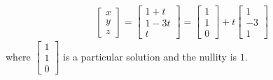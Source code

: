 \begin{solution}
\begin{align*}
\begin{bmatrix}
x \\
y \\
z
\end{bmatrix}
=
\begin{bmatrix}
1+t \\
1-3t \\
t
\end{bmatrix}
=
\begin{bmatrix}
1 \\
1 \\
0
\end{bmatrix}
+ t
\begin{bmatrix}
1 \\
-3 \\
1
\end{bmatrix}
\end{align*}
where $\begin{bmatrix}
1 \\
1 \\
0    
\end{bmatrix}$
is a particular solution and the nullity is $1$.
\end{solution}

